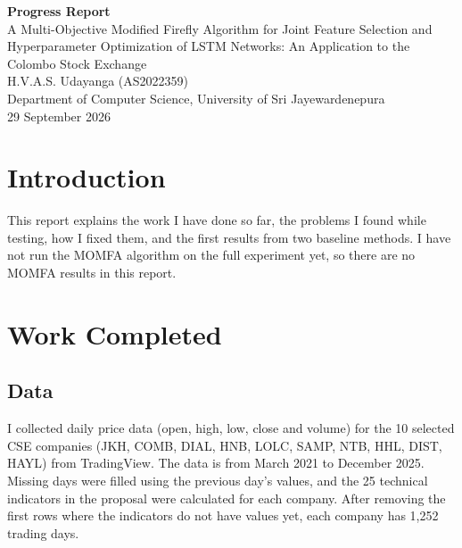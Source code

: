 \documentclass[11pt,a4paper]{article}
\begin{document}
\begin{center}
  {\Large \textbf{Progress Report}}\\[6pt]
  {\large A Multi-Objective Modified Firefly Algorithm for Joint Feature Selection and
  Hyperparameter Optimization of LSTM Networks: An Application to the Colombo Stock Exchange}\\[12pt]
  H.V.A.S. Udayanga (AS2022359)\\
  Department of Computer Science, University of Sri Jayewardenepura\\[4pt]
  29 September 2026
\end{center}

\section{Introduction}

This report explains the work I have done so far, the problems I found while testing,
how I fixed them, and the first results from two baseline methods. I have not run the
MOMFA algorithm on the full experiment yet, so there are no MOMFA results in this report.

\section{Work Completed}

\subsection{Data}
I collected daily price data (open, high, low, close and volume) for the 10 selected CSE
companies (JKH, COMB, DIAL, HNB, LOLC, SAMP, NTB, HHL, DIST, HAYL) from TradingView. The data
is from March 2021 to December 2025. Missing days were filled using the previous day's
values, and the 25 technical indicators in the proposal were calculated for each company.
After removing the first rows where the indicators do not have values yet, each company has
1,252 trading days.
\end{document}
